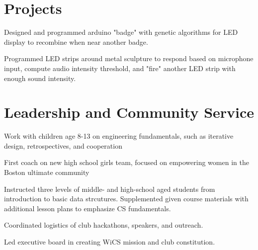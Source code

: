 \documentclass[]{csaund_resume-openfont}
\begin{document}
\begin{minipage}[t]{0.66\textwidth}
\section{Projects}
\begin{tightemize}
\item Designed and programmed arduino "badge" with  genetic algorithms for LED display to recombine when near another badge.
\end{tightemize}
\sectionsep
{}
\begin{tightemize}
\item Programmed LED strips around metal sculpture to respond based on microphone input, compute audio intensity threshold, and "fire" another LED strip with enough sound intensity.
\end{tightemize}
\sectionsep

\end{minipage}

\pagebreak


\section{Leadership and Community Service}
Work with children age 8-13 on engineering fundamentals, such as iterative design, retrospectives, and cooperation
\sectionsep

First coach on new high school girls team, focused on empowering women in the Boston ultimate community
\sectionsep

Instructed three levels of middle- and high-school aged students from introduction to basic data strcutures. Supplemented given course materials with additional lesson plans to emphasize CS fundamentals.
\sectionsep

\begin{tightemize}
\item Coordinated logistics of club hackathons, speakers, and outreach.
\item Led executive board in creating WiCS mission and club constitution.
\end{tightemize}
\sectionsep
\end{document}
